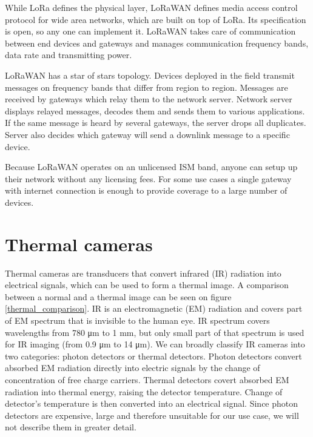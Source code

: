 While LoRa defines the physical layer, LoRaWAN defines media access control protocol for wide area networks, which are built on top of LoRa\cite{lora_article}.
Its specification is open, so any one can implement it.
LoRaWAN takes care of communication between end devices and gateways and manages communication frequency bands, data rate and transmitting power.

LoRaWAN has a star of stars topology\cite{lora_article}.
Devices deployed in the field transmit messages on frequency bands that differ from region to region. 
Messages are received by gateways which relay them to the network server.
Network server displays relayed messages, decodes them and sends them to various applications.
If the same message is heard by several gateways, the server drops all duplicates.
Server also decides which gateway will send a downlink message to a specific device. 

Because LoRaWAN operates on an unlicensed ISM band, anyone can setup up their network without any licensing fees.
For some use cases a single gateway with internet connection is enough to provide coverage to a large number of devices.


\section{ Thermal cameras}

Thermal cameras are transducers that convert infrared (IR) radiation into electrical signals, which can be used to form a thermal image.
A comparison between a normal and a thermal image can be seen on figure \ref{thermal_comparison}.
IR is an electromagnetic (EM) radiation and covers part of EM spectrum that is invisible to the human eye.
IR spectrum covers wavelengths from 780 \si{\micro\meter} to 1 \si{\milli\meter}, but only small part of that spectrum is used for IR imaging (from 0.9 \si{\micro\meter} to 14 \si{\micro\meter})\cite{thermal_book}.
We can broadly classify IR cameras into two categories: photon detectors or thermal detectors\cite{thermal_book}.
Photon detectors convert absorbed EM radiation directly into electric signals by the change of concentration of free charge carriers\cite{thermal_book}.
Thermal detectors covert absorbed EM radiation into thermal energy, raising the detector temperature\cite{thermal_book}. 
Change of detector's temperature is then converted into an electrical signal.
Since photon detectors are expensive, large and therefore unsuitable for our use case, we will not describe them in greater detail.
\newline 

